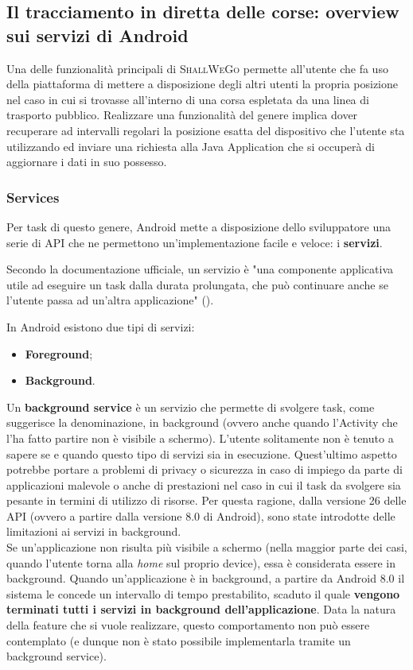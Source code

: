         \subsection{Il tracciamento in diretta delle corse: overview sui servizi di Android}
            Una delle funzionalità principali di \textsc{ShallWeGo} permette all'utente che fa uso della piattaforma di mettere a disposizione degli altri utenti la propria posizione nel caso in cui si trovasse all'interno di una corsa espletata da una linea di trasporto pubblico.
            Realizzare una funzionalità del genere implica dover recuperare ad intervalli regolari la posizione esatta del dispositivo che l'utente sta utilizzando ed inviare una richiesta alla Java Application che si occuperà di aggiornare i dati in suo possesso.
            
            \subsubsection{Services}
                Per task di questo genere, Android mette a disposizione dello sviluppatore una serie di API che ne permettono un'implementazione facile e veloce: i \textbf{servizi}.

                Secondo la documentazione ufficiale, un servizio è "una componente applicativa utile ad eseguire un task dalla durata prolungata, che può continuare anche se l'utente passa ad un'altra applicazione" (\cite{AndroidDocService}).

                In Android esistono due tipi di servizi: 

                \begin{itemize}
                    \item \textbf{Foreground};
                    \item \textbf{Background}.
                \end{itemize}
                Un \textbf{background service} è un servizio che permette di svolgere task, come suggerisce la denominazione, in background (ovvero anche quando l'Activity che l'ha fatto partire non è visibile a schermo). L'utente solitamente non è tenuto a sapere se e quando questo tipo di servizi sia in esecuzione. Quest'ultimo aspetto potrebbe portare a problemi di privacy o sicurezza in caso di impiego da parte di applicazioni malevole o anche di prestazioni nel caso in cui il task da svolgere sia pesante in termini di utilizzo di risorse. Per questa ragione, dalla versione 26 delle API (ovvero a partire dalla versione 8.0 di Android), sono state introdotte delle limitazioni ai servizi in background. \\
                Se un'applicazione non risulta più visibile a schermo (nella maggior parte dei casi, quando l'utente torna alla \textit{home} sul proprio device), essa è considerata essere in background. Quando un'applicazione è in background, a partire da Android 8.0 il sistema le concede un intervallo di tempo prestabilito, scaduto il quale \textbf{vengono terminati tutti i servizi in background dell'applicazione}. Data la natura della feature che si vuole realizzare, questo comportamento non può essere contemplato (e dunque non è stato possibile implementarla tramite un background service).
                
